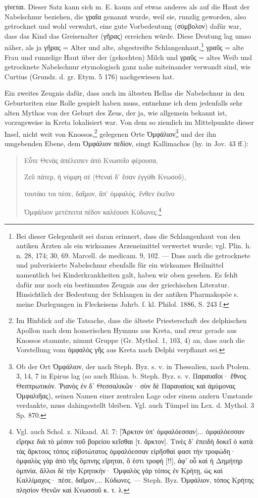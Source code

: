 \documentclass[a4paper, 11pt, oneside]{article}
\begin{document}
γίνεται. Dieser Satz kann sich m. E. kaum auf etwas anderes als auf die Haut der Nabelschnur beziehen, die γραῖα genannt wurde, weil sie, runzlig geworden, also getrocknet und wohl verwahrt, eine gute Vorbedeutung (σύμβολον) dafür war, dass das Kind das Greisenalter (γῆρας) erreichen würde. Diese Deutung lag umso näher, als ja γῆρας = Alter und alte, abgestreifte Schlangenhaut,\footnote{Bei dieser Gelegenheit sei daran erinnert, dass die Schlangenhaut von den antiken Ärzten als ein wirksames Arzeneimittel verwertet wurde; vgl. Plin. h. n. 28, 174; 30, 69. Marcell. de medicam. 9, 102. --- Dass auch die getrocknete und pulverisierte Nabelschnur ebenfalls für ein wirksames Heilmittel namentlich bei Kinderkrankheiten galt, haben wir oben gesehen. Es fehlt dafür nur noch ein bestimmtes Zeugnis aus der griechischen Literatur. Hinsichtlich der Bedeutung der Schlangen in der antiken Pharmakopöe s. meine Darlegungen in Fleckeisens Jahrb. f. kl. Philol. 1886, S. 243 f.} γραῦς = alte Frau und runzelige Haut über der (gekochten) Milch und γραῦς = altes Weib und getrocknete Nabelschnur etymologisch ganz nahe miteinander verwandt sind, wie Curtius (Grundz. d. gr. Etym. 5 176) nachgewiesen hat.

Ein zweites Zeugnis dafür, dass auch im ältesten Hellas die Nabelschnur in den Geburtsriten eine Rolle gespielt haben muss, entnehme ich dem jedenfalls sehr alten Mythos von der Geburt des Zeus, der ja, wie allgemein bekannt ist, vorzugsweise in Kreta lokalisiert war. Von dem so ziemlich im Mittelpunkte dieser Insel, nicht weit von Knossos,\footnote{Im Hinblick auf die Tatsache, dass die älteste Priesterschaft des delphischen Apollon nach dem homerischen Hymnus aus Kreta, und zwar gerade aus Knossos stammte, nimmt Gruppe (Gr. Mythol. 1, 103, 4) an, dass auch die Vorstellung vom ὀμφαλὸς γῆς aus Kreta nach Delphi verpflanzt sei.} gelegenen Orte Ὀμφάλιον\footnote{Ob der Ort Ὀμφάλιον, der nach Steph. Byz. s. v. in Thessalien, nach Ptolem. 3, 14, 7 in Epirus lag (so auch Rhian. b. Steph. Byz. s. v. Παραυαῖοι· ἔθνος Θεσπρωτικόν. Ῥιανὸς ἐν δ΄ Θεσσαλικῶν· σὺν δὲ Παραυαίοις καὶ ἀμύμονας Ὀμφαλιῆας), seinen Namen einer zentralen Lage oder einem andern Umstande verdankte, muss dahingestellt bleiben. Vgl. auch Tümpel im Lex. d. Mythol. 3 Sp. 870.} und der ihn umgebenden Ebene, dem Ὀμφάλιον πεδίον, singt Kallimachos (hy. in Jov. 43 ff.):
\begin{quotation}
Εὗτε Θενὰς ἀπέλειπεν ἀπὸ Κνωσοῖο φέρουσα,

Ζεῦ πάτερ, ἡ νύμφη σέ (Θεναὶ δ' ἔσαν ἐγγύθι Κνωσοῦ),

τουτάκι τοι πέσε, δαῖμον, ἄπ' ὀμφαλός. ἔνθεν ἐκεῖνο

Ὀμφάλιον μετέπειτα πέδον καλέουσι Κύδωνες.\footnote{Vgl. auch Schol. z. Nikand. Al. 7: [Ἄρκτον ὑπ' ὀμφαλόεσσαν]... ὀμφαλόεσσαν εἴρηκε διὰ τὸ μέσον τοῦ βορείου κεῖσθαι [τ. ἄρκτον]. Τινὲς δ' ἐπειδὴ δοκεῖ ὁ κατὰ τὰς ἄρκτους τόπος εὐβοτώτατος ὀμφαλόεσσαν εἰρῆσθαί φασι τὴν τροφώδη· ὀμφαλὸς γὰρ ἀπὸ τῆς ὄμπνης εἴρηται, ὅ ἐστι τροφή [!!], ἀφ' οὗ καὶ ἡ Δημήτηρ ὀμπνία, ἄλλοι δὲ τὴν Κρητικήν· Ὀμφαλὸς γὰρ τόπος ἐν Κρήτῃ, ὡς καὶ Καλλίμαχος· πέσε, δαῖμον,... Κύδωνες. --- Steph. Byz. Ὀμφάλιον, τόπος Κρήτης πλησίον Θενῶν καὶ Κνωσσοῦ κ. τ. λ.}
\end{quotation}
\end{document}

